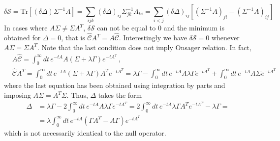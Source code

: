 \documentclass[12pt]{iopart}
\newcommand{\lx} {\left}
\newcommand{\rx} {\right}
\newcommand{\cS} {\mathcal{S}}
\newcommand{\cC} {\mathcal{C}}
\begin{document}
\begin{equation}
\delta \cS = \text{Tr}\lx[(\delta\Delta) \Sigma^{-1}A\rx]=\sum_{ijk}(\delta\Delta)_{ij}\Sigma_{jk}^{-1}A_{ki}=\sum_{i<j}(\delta\Delta)_{ij}\lx[\lx(\Sigma^{-1}A\rx)_{ji}-\lx(\Sigma^{-1}A\rx)_{ij}\rx]
\end{equation}
In cases where $A\Sigma\neq\Sigma A^T$, $\delta \cS$ can not be equal to $0$ and the minimum is obtained for $\Delta =0$, that is $\widehat{\cC}A^T=A\widehat{\cC}$. Interestingly we have $\delta \cS=0$ whenever $A\Sigma=\Sigma A^T$. Note that the last condition does not imply Onsager relation. In fact,
\begin{align}
&A\widehat{\cC}=\int_0^\infty dt \, e^{-tA} A\lx(\Sigma+\lambda\Gamma\rx) e^{-t A^T}\,,\\
&\widehat{\cC}A^T=\int_0^\infty dt \, e^{-tA} \lx(\Sigma+\lambda\Gamma\rx)A^T e^{-t A^T}=\lambda\Gamma-\int_0^\infty dt \, e^{-tA} A\lambda\Gamma e^{-t A^T}+\int_0^\infty dt \, e^{-tA} A\Sigma e^{-t A^T}
\end{align}
where the last equation has been obtained using integration by parts and imposing $A\Sigma=A^T\Sigma$. Thus, $\Delta$ takes the form
\begin{align}
\Delta&= \lambda\Gamma-2 \int_0^\infty dt \, e^{-tA} A\lambda\Gamma e^{-t A^T}=2 \int_0^\infty dt \, e^{-tA} \lambda\Gamma A^T e^{-t A^T}-\lambda \Gamma =\nonumber\\
&=\lambda \int_0^\infty dt \, e^{-tA} \lx(\Gamma A^T- A\Gamma\rx)e^{-t A^T}
\end{align}
which is not necessarily identical to the null operator.
\end{document}
